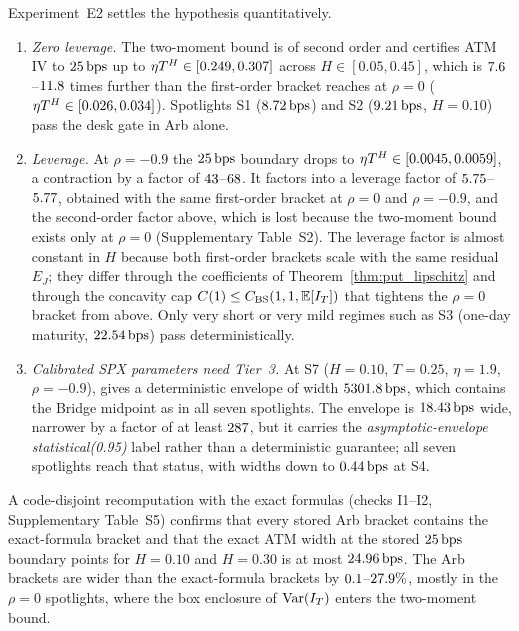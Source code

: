 Experiment~E2 settles the hypothesis quantitatively.
\begin{enumerate}[1.]
  \item \emph{Zero leverage.} The two-moment bound is of second order and certifies ATM IV to $25\,\mathrm{bps}$ up to $\eta T^H\in[0.249,0.307]$ across $H\in[0.05,0.45]$, which is $7.6$--$11.8$ times further than the first-order bracket reaches at $\rho=0$ ($\eta T^H\in[0.026,0.034]$). Spotlights S1 ($8.72\,\mathrm{bps}$) and S2 ($9.21\,\mathrm{bps}$, $H=0.10$) pass the desk gate in Arb alone.
  \item \emph{Leverage.} At $\rho=-0.9$ the $25\,\mathrm{bps}$ boundary drops to $\eta T^H\in[0.0045,0.0059]$, a contraction by a factor of $43$--$68$. It factors into a leverage factor of $5.75$--$5.77$, obtained with the same first-order bracket at $\rho=0$ and $\rho=-0.9$, and the second-order factor above, which is lost because the two-moment bound exists only at $\rho=0$ (Supplementary Table~S2). The leverage factor is almost constant in $H$ because both first-order brackets scale with the same residual $E_J$; they differ through the coefficients of Theorem~\ref{thm:put_lipschitz} and through the concavity cap $C(1)\le C_{\mathrm{BS}}(1,1,\mathbb{E}[I_T])$ that tightens the $\rho=0$ bracket from above. Only very short or very mild regimes such as S3 (one-day maturity, $22.54\,\mathrm{bps}$) pass deterministically.
  \item \emph{Calibrated SPX parameters need Tier~3.} At S7 ($H=0.10$, $T=0.25$, $\eta=1.9$, $\rho=-0.9$), \RCDet{} gives a deterministic envelope of width $5301.8\,\mathrm{bps}$, which contains the Bridge midpoint as in all seven spotlights. The \RCBridge{} envelope is $18.43\,\mathrm{bps}$ wide, narrower by a factor of at least $287$, but it carries the \emph{asymptotic-envelope statistical(0.95)} label rather than a deterministic guarantee; all seven spotlights reach that status, with widths down to $0.44\,\mathrm{bps}$ at S4.
\end{enumerate}
A code-disjoint recomputation with the exact formulas (checks I1--I2, Supplementary Table~S5) confirms that every stored Arb bracket contains the exact-formula bracket and that the exact ATM width at the stored $25\,\mathrm{bps}$ boundary points for $H=0.10$ and $H=0.30$ is at most $24.96\,\mathrm{bps}$. The Arb brackets are wider than the exact-formula brackets by $0.1$--$27.9\%$, mostly in the $\rho=0$ spotlights, where the box enclosure of $\operatorname{Var}(I_T)$ enters the two-moment bound.

\FloatBarrier
